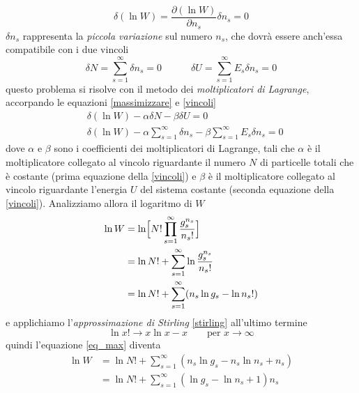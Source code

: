 \begin{equation}
\delta (\ln W) = \frac{ \partial (\ln W)}{\partial n_s } \delta n_s = 0
\label{massimizzare}
\end{equation}
$\delta n_s$ rappresenta la \textit{piccola variazione} sul numero $n_s$, che dovrà essere anch'essa compatibile con i due vincoli
\begin{equation}
\delta N = \sum_{s=1}^{\infty} \delta n_s = 0
\quad\quad\quad
\delta U = \sum_{s=1}^{\infty} E_s \delta n_s = 0
\label{vincoli}
\end{equation}
questo problema si risolve con il metodo dei \textit{moltiplicatori di Lagrange}, accorpando le equazioni \ref{massimizzare} e \ref{vincoli}
\begin{equation}
\begin{split}
& \delta (\ln W)   - \alpha \delta N  - \beta \delta U  = 0 \\
& \delta (\ln W)   - \alpha  \sum_{s=1}^{\infty} \delta n_s   - \beta  \sum_{s=1}^{\infty} E_s \delta n_s  = 0
\label{molti_lag}
\end{split}
\end{equation}
dove $\alpha$ e $\beta$ sono i coefficienti dei moltiplicatori di Lagrange, tali che $\alpha$ è il moltiplicatore collegato al vincolo riguardante il numero $N$ di particelle totali che è costante (prima equazione della \ref{vincoli}) e $\beta$ è il moltiplicatore collegato al vincolo riguardante l'energia $U$ del sistema costante (seconda equazione della \ref{vincoli}).
Analizziamo allora il logaritmo di $W$
\begin{equation}
\begin{split}
\ln W & = \ln \Bigl[ N! \prod_{s=1}^{\infty}\frac{ g_s^{n_s}}{ n_s!} \Bigr] \\
& = \ln N! + \sum_{s=1}^{\infty}\ln \frac{ g_s^{n_s}}{ n_s!}  \\
& = \ln N! + \sum_{s=1}^{\infty} (n_s \ln g_s - \ln n_s !)
\label{eq_max}
\end{split}
\end{equation}
e applichiamo l'\textit{approssimazione di Stirling} \ref{stirling} all'ultimo termine
\begin{equation}
\ln x! \to x \ln x - x \quad\quad \mbox{per } x \to \infty
\label{stirling}
\end{equation}
quindi l'equazione \ref{eq_max} diventa
\begin{equation}
\begin{split}
\ln W & = \ln N! + \sum_{s=1}^{\infty} (n_s \ln g_s - n_s \ln n_s + n_s) \\
& = \ln N! + \sum_{s=1}^{\infty} (\ln g_s - \ln n_s + 1) n_s
\end{split}
\end{equation}
